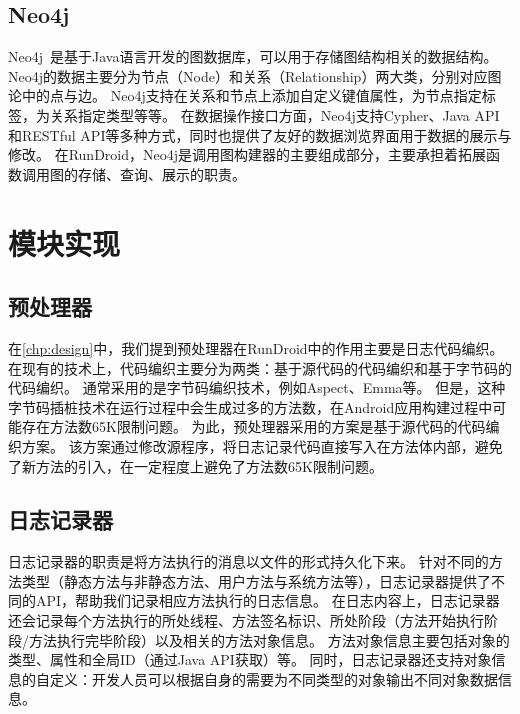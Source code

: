 \subsection{Neo4j}

Neo4j~\cite{Neo4jthe19}是基于Java语言开发的图数据库，可以用于存储图结构相关的数据结构。
Neo4j的数据主要分为节点（Node）和关系（Relationship）两大类，分别对应图论中的点与边。
Neo4j支持在关系和节点上添加自定义键值属性，为节点指定标签，为关系指定类型等等。
在数据操作接口方面，Neo4j支持Cypher、Java API和RESTful API等多种方式，同时也提供了友好的数据浏览界面用于数据的展示与修改。
在RunDroid，Neo4j是调用图构建器的主要组成部分，主要承担着拓展函数调用图的存储、查询、展示的职责。


\section{模块实现}



\subsection{预处理器}

在\autoref{chp:design}中，我们提到预处理器在RunDroid中的作用主要是日志代码编织。
在现有的技术上，代码编织主要分为两类：基于源代码的代码编织和基于字节码的代码编织。
通常采用的是字节码编织技术，例如Aspect、Emma等。
但是，这种字节码插桩技术在运行过程中会生成过多的方法数，在Android应用构建过程中可能存在方法数65K限制问题。
为此，预处理器采用的方案是基于源代码的代码编织方案。
该方案通过修改源程序，将日志记录代码直接写入在方法体内部，避免了新方法的引入，在一定程度上避免了方法数65K限制问题。




\subsection{日志记录器}

日志记录器的职责是将方法执行的消息以文件的形式持久化下来。
针对不同的方法类型（静态方法与非静态方法、用户方法与系统方法等），日志记录器提供了不同的API，帮助我们记录相应方法执行的日志信息。
在日志内容上，日志记录器还会记录每个方法执行的所处线程、方法签名标识、所处阶段（方法开始执行阶段/方法执行完毕阶段）以及相关的方法对象信息。
方法对象信息主要包括对象的类型、属性和全局ID（通过Java API获取）等。
同时，日志记录器还支持对象信息的自定义：开发人员可以根据自身的需要为不同类型的对象输出不同对象数据信息。



